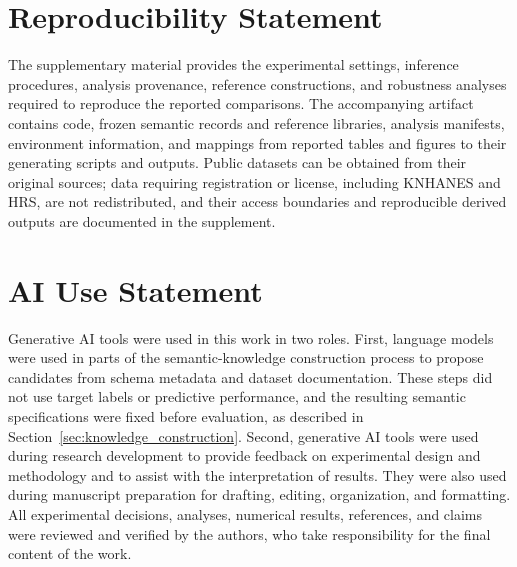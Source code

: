 \documentclass{article} %
\begin{document}
\section*{Reproducibility Statement}

The supplementary material provides the experimental settings, inference procedures, analysis provenance, reference constructions, and robustness analyses required to reproduce the reported comparisons.
The accompanying artifact contains code, frozen semantic records and reference libraries, analysis manifests, environment information, and mappings from reported tables and figures to their generating scripts and outputs.
Public datasets can be obtained from their original sources; data requiring registration or license, including KNHANES and HRS, are not redistributed, and their access boundaries and reproducible derived outputs are documented in the supplement.

\section*{AI Use Statement}

Generative AI tools were used in this work in two roles.
First, language models were used in parts of the semantic-knowledge construction process to propose candidates from schema metadata and dataset documentation.
These steps did not use target labels or predictive performance, and the resulting semantic specifications were fixed before evaluation, as described in Section~\ref{sec:knowledge_construction}.
Second, generative AI tools were used during research development to provide feedback on experimental design and methodology and to assist with the interpretation of results.
They were also used during manuscript preparation for drafting, editing, organization, and formatting.
All experimental decisions, analyses, numerical results, references, and claims were reviewed and verified by the authors, who take responsibility for the final content of the work.




\ifdefined\ICLRIncludeAppendix

\fi
\end{document}

